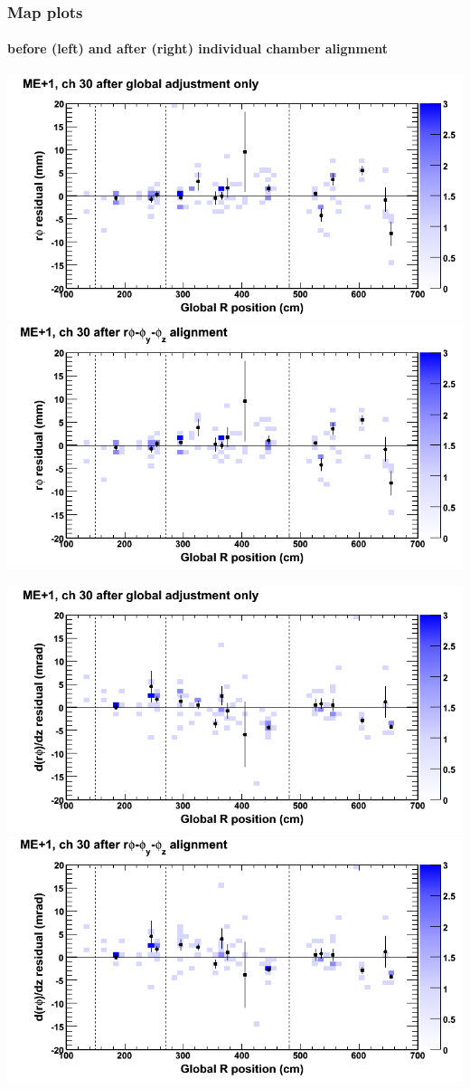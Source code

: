 \documentclass[compress]{beamer}
\begin{document}
\begin{frame}
\frametitle{Map plots}
\framesubtitle{before (left) and after (right) individual chamber alignment}
\includegraphics[width=0.5\linewidth]{ringmapplots_3dof/before_CSCvsr_mep1ch30_x.png} \includegraphics[width=0.5\linewidth]{ringmapplots_3dof/after_CSCvsr_mep1ch30_x.png}

\includegraphics[width=0.5\linewidth]{ringmapplots_3dof/before_CSCvsr_mep1ch30_dxdz.png} \includegraphics[width=0.5\linewidth]{ringmapplots_3dof/after_CSCvsr_mep1ch30_dxdz.png}
\end{frame}
\end{document}
